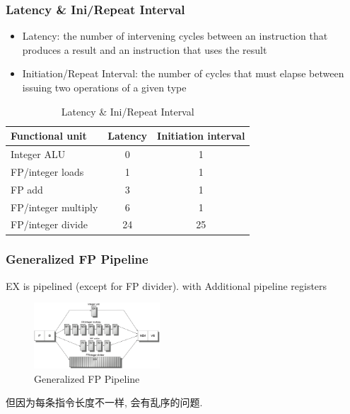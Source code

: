 \subsubsection{Latency \& Ini/Repeat Interval}
\begin{itemize}\small
    \item Latency: the number of intervening cycles
    between an instruction that produces a
    result and an instruction that uses the
    result
    \item Initiation/Repeat Interval: the number of cycles that must elapse
    between issuing two operations of a
    given type
\end{itemize}
\begin{table}[!htb]
    \centering
    \caption{Latency \& Ini/Repeat Interval}
    \begin{tabular}[c]{lcc}\toprule
        \textbf{Functional unit} & \textbf{Latency} & \textbf{Initiation interval} \\ \midrule
        Integer ALU         & 0 & 1 \\
        FP/integer loads    & 1 & 1 \\
        FP add              & 3 & 1 \\
        FP/integer multiply & 6 & 1 \\
        FP/integer divide   & 24 & 25 \\
        \bottomrule
    \end{tabular}
\end{table}


\subsubsection{Generalized FP Pipeline}
EX is pipelined (except for FP divider). with Additional pipeline registers
\begin{figure}[!htb]
    \centering
    \includegraphics[width=0.42\textwidth]{pic/CA3/Generalized FP Pipeline}
    \caption{Generalized FP Pipeline}
\end{figure}
但因为每条指令长度不一样, 会有乱序的问题. 


